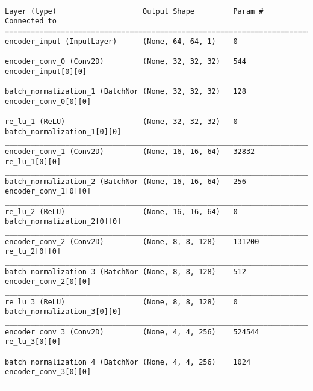 \begin{lstlisting}[caption={(dSprites, 7,500, 6,250, 5,000, 3,750)-\ac{VAE} Encoder},captionpos=b,basicstyle=\tiny, label={lst:dsprites-vae-encoder}]
__________________________________________________________________________________________________
Layer (type)                    Output Shape         Param #     Connected to
==================================================================================================
encoder_input (InputLayer)      (None, 64, 64, 1)    0
__________________________________________________________________________________________________
encoder_conv_0 (Conv2D)         (None, 32, 32, 32)   544         encoder_input[0][0]
__________________________________________________________________________________________________
batch_normalization_1 (BatchNor (None, 32, 32, 32)   128         encoder_conv_0[0][0]
__________________________________________________________________________________________________
re_lu_1 (ReLU)                  (None, 32, 32, 32)   0           batch_normalization_1[0][0]
__________________________________________________________________________________________________
encoder_conv_1 (Conv2D)         (None, 16, 16, 64)   32832       re_lu_1[0][0]
__________________________________________________________________________________________________
batch_normalization_2 (BatchNor (None, 16, 16, 64)   256         encoder_conv_1[0][0]
__________________________________________________________________________________________________
re_lu_2 (ReLU)                  (None, 16, 16, 64)   0           batch_normalization_2[0][0]
__________________________________________________________________________________________________
encoder_conv_2 (Conv2D)         (None, 8, 8, 128)    131200      re_lu_2[0][0]
__________________________________________________________________________________________________
batch_normalization_3 (BatchNor (None, 8, 8, 128)    512         encoder_conv_2[0][0]
__________________________________________________________________________________________________
re_lu_3 (ReLU)                  (None, 8, 8, 128)    0           batch_normalization_3[0][0]
__________________________________________________________________________________________________
encoder_conv_3 (Conv2D)         (None, 4, 4, 256)    524544      re_lu_3[0][0]
__________________________________________________________________________________________________
batch_normalization_4 (BatchNor (None, 4, 4, 256)    1024        encoder_conv_3[0][0]
__________________________________________________________________________________________________

\end{lstlisting}
